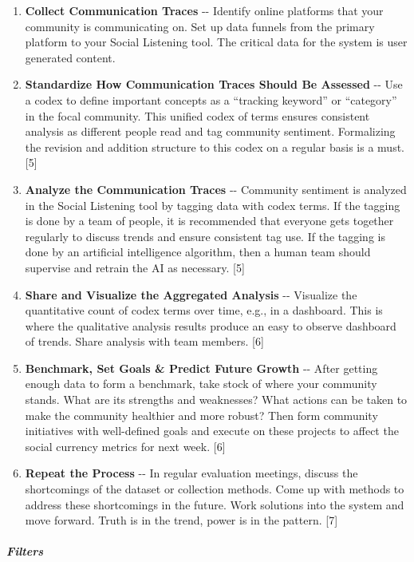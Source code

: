 \begin{enumerate}
\def\labelenumi{\arabic{enumi}.}
\item
  \textbf{Collect Communication Traces} -\/- Identify online platforms
  that your community is communicating on. Set up data funnels from the
  primary platform to your Social Listening tool. The critical data for
  the system is user generated content.
\item
  \textbf{Standardize How Communication Traces Should Be Assessed} -\/-
  Use a codex to define important concepts as a ``tracking keyword'' or
  ``category'' in the focal community. This unified codex of terms
  ensures consistent analysis as different people read and tag community
  sentiment. Formalizing the revision and addition structure to this
  codex on a regular basis is a must. {[}5{]}
\item
  \textbf{Analyze the Communication Traces} -\/- Community sentiment is
  analyzed in the Social Listening tool by tagging data with codex
  terms. If the tagging is done by a team of people, it is recommended
  that everyone gets together regularly to discuss trends and ensure
  consistent tag use. If the tagging is done by an artificial
  intelligence algorithm, then a human team should supervise and retrain
  the AI as necessary. {[}5{]}
\item
  \textbf{Share and Visualize the Aggregated Analysis} -\/- Visualize
  the quantitative count of codex terms over time, e.g., in a dashboard.
  This is where the qualitative analysis results produce an easy to
  observe dashboard of trends. Share analysis with team members. {[}6{]}
\item
  \textbf{Benchmark, Set Goals \& Predict Future Growth} -\/- After
  getting enough data to form a benchmark, take stock of where your
  community stands. What are its strengths and weaknesses? What actions
  can be taken to make the community healthier and more robust? Then
  form community initiatives with well-defined goals and execute on
  these projects to affect the social currency metrics for next week.
  {[}6{]}
\item
  \textbf{Repeat the Process} -\/- In regular evaluation meetings,
  discuss the shortcomings of the dataset or collection methods. Come up
  with methods to address these shortcomings in the future. Work
  solutions into the system and move forward. Truth is in the trend,
  power is in the pattern. {[}7{]}
\end{enumerate}

\hypertarget{filters}{%
\subparagraph{Filters}\label{filters}}

